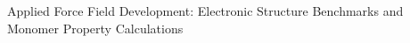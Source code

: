 \begin{chapter}{
Applied Force Field Development: Electronic Structure Benchmarks and
Monomer Property Calculations
}
\label{ch:workflow}


%







\end{chapter}

